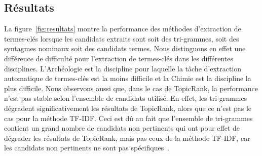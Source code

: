   \subsection{Résultats}
  \label{subsec:resultats}
    La figure~\ref{fig:resultats} montre la performance des méthodes
    d'extraction de termes-clés lorsque les candidats extraits sont soit des
    tri-grammes, soit des syntagmes nominaux soit des candidats termes.
    Nous distinguons en effet une différence de difficulté pour l'extraction de
    termes-clés dans les différentes disciplines. L'Archéologie est la
    discipline pour laquelle la tâche d'extraction automatique de termes-clés
    est la moins difficile et la Chimie est la discipline la plus difficile.
    Nous observons aussi que, dans le cas de TopicRank, la performance n'est pas
    stable selon l'ensemble de candidats utilisé. En effet, les tri-grammes
    dégradent significativement les résultats de TopicRank, alors que ce n'est
    pas le cas pour la méthode TF-IDF. Ceci est dû au fait que l'ensemble de
    tri-grammes contient un grand nombre de candidats non pertinents qui ont
    pour effet de dégrader les résultats de TopicRank, mais pas ceux de la
    méthode TF-IDF, car les candidats non pertinents ne sont pas
    spécifiques~\cite{kim2009termextraction}. 
